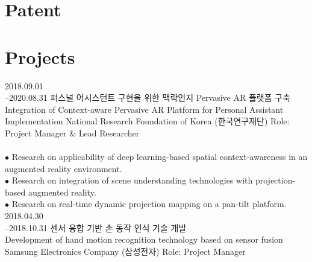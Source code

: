 \documentclass[]{friggeri-cv}
\begin{document}
\section{Patent}
\begin{refsection}
  \nocite{*}
  \printbibliography[
    type=misc, 
    title=\textbf{Domestic (Republic of Korea)}, 
    heading=subbibliography,
    keyword={patent}
  ]
\end{refsection}

\section{Projects}
\begin{entrylist}
  \entry
    {2018.09.01\\--2020.08.31} %
    {퍼스널 어시스턴트 구현을 위한 맥락인지 Pervasive AR 플랫폼 구축\\
    Integration of Context-aware Pervasive AR Platform for Personal Assistant Implementation}
    {National Research Foundation of Korea (한국연구재단)}
    {Role: Project Manager \& Lead Researcher\\
    \\
    $\bullet$ Research on applicability of deep learning-based spatial context-awareness in an augmented reality environment.\\
    $\bullet$ Research on integration of  scene understanding technologies with projection-based augmented reality.\\
    $\bullet$ Research on real-time dynamic projection mapping on a pan-tilt platform.
    }
  \entry
    {2018.04.30\\--2018.10.31}
    {센서 융합 기반 손 동작 인식 기술 개발\\
    Development of hand motion recognition technology based on sensor fusion}
    {Samsung Electronics Company (삼성전자)}
    {Role: Project Manager\\
    
}
\end{entrylist}
\end{document}
